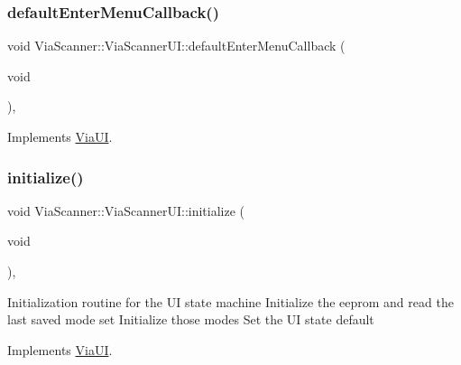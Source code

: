 \mbox{\label{class_via_scanner_1_1_via_scanner_u_i_adc8f206d1050c457af29a45cf8050faf}} 
\subsubsection{\texorpdfstring{default\+Enter\+Menu\+Callback()}{defaultEnterMenuCallback()}}
{\footnotesize\ttfamily void Via\+Scanner\+::\+Via\+Scanner\+U\+I\+::default\+Enter\+Menu\+Callback (\begin{DoxyParamCaption}\item[{void}]{ }\end{DoxyParamCaption})\hspace{0.3cm}{\ttfamily [override]}, {\ttfamily [virtual]}}



Implements \mbox{\hyperlink{class_via_u_i_a226eb7b65b6035a611dd734d965fa7c2}{Via\+UI}}.

\mbox{\label{class_via_scanner_1_1_via_scanner_u_i_ab12af2665a9e58574cd0cb4b8a003e0b}} 
\subsubsection{\texorpdfstring{initialize()}{initialize()}}
{\footnotesize\ttfamily void Via\+Scanner\+::\+Via\+Scanner\+U\+I\+::initialize (\begin{DoxyParamCaption}\item[{void}]{ }\end{DoxyParamCaption})\hspace{0.3cm}{\ttfamily [override]}, {\ttfamily [virtual]}}

Initialization routine for the UI state machine Initialize the eeprom and read the last saved mode set Initialize those modes Set the UI state default 

Implements \mbox{\hyperlink{class_via_u_i_a573ba7aef8f4982ec4900258c770bdbb}{Via\+UI}}.

